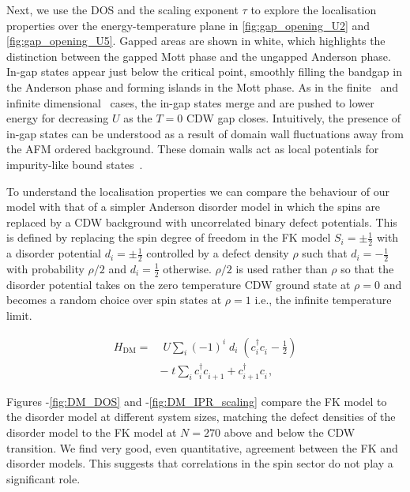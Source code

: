 Next, we use the DOS and the scaling exponent \(\tau\) to explore the localisation properties over the energy-temperature plane in \cref{fig:gap_opening_U2} and \cref{fig:gap_opening_U5}. Gapped areas are shown in white, which highlights the distinction between the gapped Mott phase and the ungapped Anderson phase. In-gap states appear just below the critical point, smoothly filling the bandgap in the Anderson phase and forming islands in the Mott phase. As in the finite~\autocite{zondaGaplessRegimeCharge2019} and infinite dimensional~\autocite{hassanSpectralPropertiesChargedensitywave2007} cases, the in-gap states merge and are pushed to lower energy for decreasing \(U\) as the \(T=0\) CDW gap closes. Intuitively, the presence of in-gap states can be understood as a result of domain wall fluctuations away from the AFM ordered background. These domain walls act as local potentials for impurity-like bound states~\autocite{zondaGaplessRegimeCharge2019}.

To understand the localisation properties we can compare the behaviour of our model with that of a simpler Anderson disorder model in which the spins are replaced by a CDW background with uncorrelated binary defect potentials. This is defined by replacing the spin degree of freedom in the FK model \(S_i = \pm \tfrac{1}{2}\) with a disorder potential \(d_i = \pm \tfrac{1}{2}\) controlled by a defect density \(\rho\) such that \(d_i = -\tfrac{1}{2}\) with probability \(\rho/2\) and \(d_i = \tfrac{1}{2}\) otherwise. \(\rho/2\) is used rather than \(\rho\) so that the disorder potential takes on the zero temperature CDW ground state at \(\rho = 0\) and becomes a random choice over spin states at \(\rho = 1\) i.e., the infinite temperature limit.

\[\begin{aligned}
H_{\mathrm{DM}} = & \;U \sum_{i} (-1)^i \; d_i \;(c^\dagger_{i}c^{\phantom{\dagger}}_{i} - \tfrac{1}{2}) \\
& -\;t \sum_{i} c^\dagger_{i}c^{\phantom{\dagger}}_{i+1} + c^\dagger_{i+1}c^{\phantom{\dagger}}_{i},
\end{aligned}\]

Figures -\cref{fig:DM_DOS} and -\cref{fig:DM_IPR_scaling} compare the FK model to the disorder model at different system sizes, matching the defect densities of the disorder model to the FK model at \(N = 270\) above and below the CDW transition. We find very good, even quantitative, agreement between the FK and disorder models. This suggests that correlations in the spin sector do not play a significant role.

